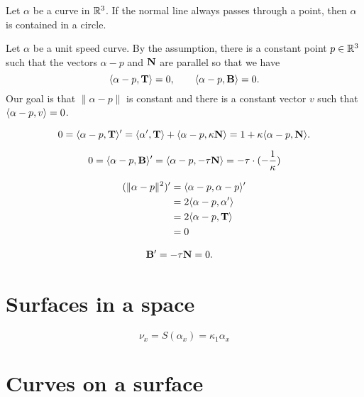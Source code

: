 \documentclass{../exp}
\def\a{\alpha}
\begin{document}
\begin{ex}
Let $\a$ be a curve in $\mathbb{R}^3$.
If the normal line always passes through a point, then $\a$ is contained in a circle.
\end{ex}
\begin{pf}
Let $\a$ be a unit speed curve.
By the assumption, there is a constant point $p\in\mathbb{R}^3$ such that the vectors $\a-p$ and $\mathbf{N}$ are parallel so that we have
\[\<\a-p,\bT\>=0,\qquad\<\a-p,\bB\>=0.\]
Our goal is that $\|\a-p\|$ is constant and there is a constant vector $v$ such that $\<\a-p,v\>=0$.

\[0=\<\a-p,\bT\>'=\<\a',\bT\>+\<\a-p,\kappa\bN\>=1+\kappa\<\a-p,\bN\>.\]

\[0=\<\a-p,\bB\>'=\<\a-p,-\tau\bN\>=-\tau\cdot(-\frac1{\kappa})\]

\begin{align*}
(\|\a-p\|^2)'&=\<\a-p,\a-p\>'\\
&=2\<\a-p,\a'\>\\
&=2\<\a-p,\bT\>\\
&=0
\end{align*}


\begin{align*}
\mathbf{B}'&=-\tau\mathbf{N}=0.
\end{align*}
\end{pf}



\section{Surfaces in a space}
\[\nu_x=S(\alpha_x)=\kappa_1\alpha_x\]


\section{Curves on a surface}
\end{document}
